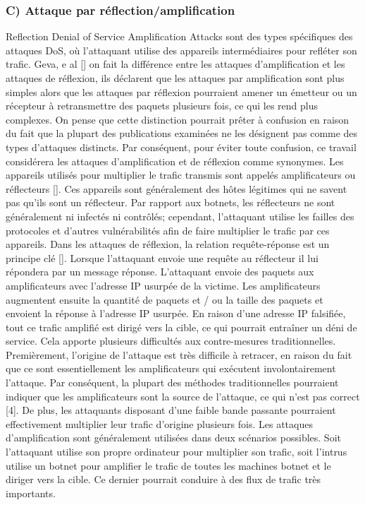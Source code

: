 \subsubsection{C) Attaque par réflection/amplification}
Reflection Denial of Service Amplification Attacks sont des types spécifiques des attaques DoS, où l'attaquant utilise des appareils intermédiaires pour refléter son trafic. Geva, e al [\cite{8}] on fait la différence entre les attaques d'amplification et les attaques de réflexion, ils déclarent que les attaques par amplification sont plus simples alors que les attaques par réflexion pourraient amener un émetteur ou un récepteur à retransmettre des paquets plusieurs fois, ce qui les rend plus complexes. On pense que cette distinction pourrait prêter à confusion en raison du fait que la plupart des publications examinées ne les désignent pas comme des types d'attaques distincts. Par conséquent, pour éviter toute confusion, ce travail considérera les attaques d'amplification et de réflexion comme synonymes. Les appareils utilisés pour multiplier le trafic transmis sont appelés amplificateurs ou réflecteurs [\cite{9}]. Ces appareils sont généralement des hôtes légitimes qui ne savent pas qu'ils sont un réflecteur. Par rapport aux botnets, les réflecteurs ne sont généralement ni infectés ni contrôlés; cependant, l'attaquant utilise les failles des protocoles et d'autres vulnérabilités afin de faire multiplier le trafic par ces appareils. Dans les attaques de réflexion, la relation requête-réponse est un principe clé [\cite{10}]. Lorsque l'attaquant envoie une requête au réflecteur il lui répondera par un message réponse. L'attaquant envoie des paquets aux amplificateurs avec l'adresse IP usurpée de la victime. Les amplificateurs augmentent ensuite la quantité de paquets et / ou la taille des paquets et envoient la réponse à l'adresse IP usurpée. En raison d'une adresse IP falsifiée, tout ce trafic amplifié est dirigé vers la cible, ce qui pourrait entraîner un déni de service. Cela apporte plusieurs difficultés aux contre-mesures traditionnelles. Premièrement, l'origine de l'attaque est très difficile à retracer, en raison du fait que ce sont essentiellement les amplificateurs qui exécutent involontairement l'attaque. Par conséquent, la plupart des méthodes traditionnelles pourraient indiquer que les amplificateurs sont la source de l'attaque, ce qui n'est pas correct [4]. De plus, les attaquants disposant d'une faible bande passante pourraient effectivement multiplier leur trafic d'origine plusieurs fois. Les attaques d'amplification sont généralement utilisées dans deux scénarios possibles. Soit l'attaquant utilise son propre ordinateur pour multiplier son trafic, soit l'intrus utilise un botnet pour amplifier le trafic de toutes les machines botnet et le diriger vers la cible. Ce dernier pourrait conduire à des flux de trafic très importants.

